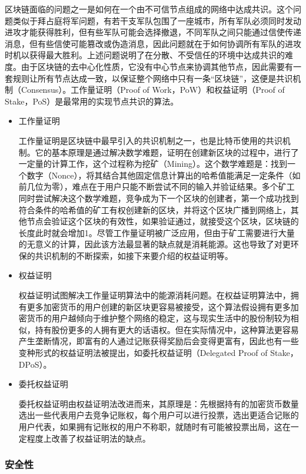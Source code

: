     区块链面临的问题之一是如何在一个由不可信节点组成的网络中达成共识。这个问题类似于拜占庭将军问题\cite{Lamport1982TheBG}，有若干支军队包围了一座城市，所有军队必须同时发动进攻才能获得胜利，但有些军队可能会选择撤退，不同军队之间只能通过信使传递消息，但有些信使可能篡改或伪造消息，因此问题就在于如何协调所有军队的进攻时机以获得最大胜利。上述问题说明了在分散、不受信任的环境中达成共识的难度。由于区块链的去中心化性质，它没有中心节点来协调其他节点，因此需要有一套规则让所有节点达成一致，以保证整个网络中只有一条“区块链”，这便是共识机制（Consensus）。工作量证明（Proof of Work，PoW）和权益证明（Proof of Stake，PoS）是最常用的实现节点共识的算法。
    \begin{itemize}
        \item 工作量证明
        
        工作量证明是区块链中最早引入的共识机制之一，也是比特币使用的共识机制。它的基本原理是通过解决数学难题，证明在创建新区块的过程中，进行了一定量的计算工作，这个过程称为挖矿（Mining）。这个数学难题是：找到一个数字（Nonce），将其结合其他固定信息计算出的哈希值能满足一定条件（如前几位为零），难点在于用户只能不断尝试不同的输入并验证结果。多个矿工同时尝试解决这个数学难题，竞争成为下一个区块的创建者，第一个成功找到符合条件的哈希值的矿工有权创建新的区块，并将这个区块广播到网络上，其他节点会验证这个区块的有效性，如果验证通过，就接受这个区块，区块链的长度此时就会增加1。尽管工作量证明被广泛应用，但由于矿工需要进行大量的无意义的计算，因此该方法最显著的缺点就是消耗能源\cite{wangdan}。这也导致了对更环保的共识机制的不断探索，如接下来要介绍的权益证明等。
        \item 权益证明
        
        权益证明试图解决工作量证明算法中的能源消耗问题。在权益证明算法中，拥有更多加密货币的用户创建的新区块更容易被接受，这个算法假设拥有更多加密货币的用户越倾向于维护整个网络的稳定\cite{zheng2017overview}，这与现实生活中的股份制较为相似，持有股份更多的人拥有更大的话语权。但在实际情况中，这种算法更容易产生垄断情况，即富有的人通过记账获得奖励后会变得更富有，因此也有一些变种形式的权益证明法被提出，如委托权益证明（Delegated Proof of Stake，DPoS）。
        \item 委托权益证明
        
        委托权益证明由权益证明法改进而来，其原理是：先根据持有的加密货币数量选出一些代表用户去竞争记账权，每个用户可以进行投票，选出更适合记账的用户代表，如果拥有记账权的用户不称职，就随时有可能被投票出局，这在一定程度上改善了权益证明法的缺点。
    \end{itemize}
    \subsubsection{安全性}
    

